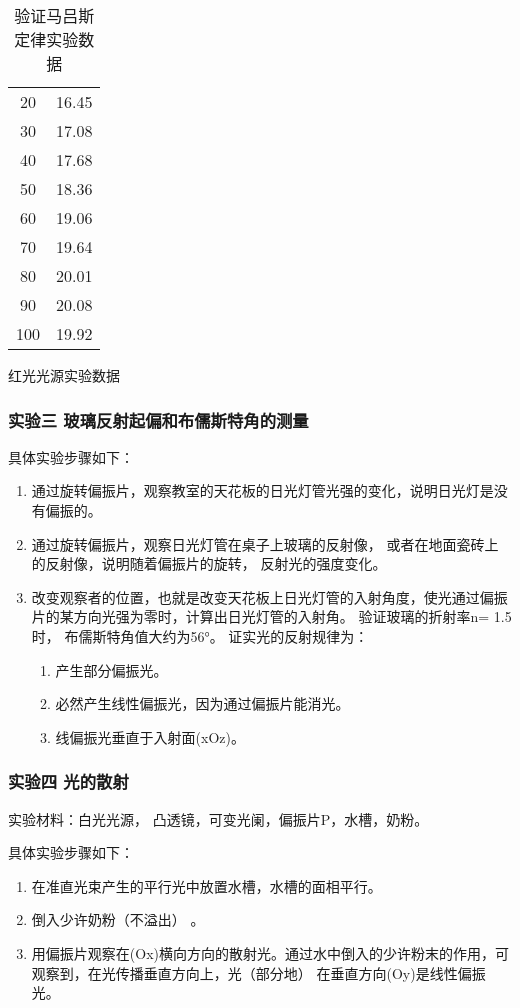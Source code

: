 \documentclass[dvipsnames, svgnames,a4paper,11pt]{article}
\begin{document}
\begin{table}[htbp]
\begin{minipage}[t]{0.3\linewidth}
\begin{tabular}{|cc|}
			20  & 16.45  \\
			30  & 17.08  \\
			40  & 17.68  \\
			50  & 18.36  \\
			60  & 19.06  \\
			70  & 19.64  \\
			80  & 20.01  \\
			90  & 20.08  \\
			100 & 19.92  \\
			\hline
			\end{tabular}
			\caption{红光光源实验数据}
		\end{minipage}
		\caption{验证马吕斯定律实验数据}
		\label{tbl:table2-1}
	\end{table}

	\subsubsection{实验三 \quad 玻璃反射起偏和布儒斯特角的测量}


	具体实验步骤如下：
	\begin{enumerate}
		\item 通过旋转偏振片，观察教室的天花板的日光灯管光强的变化，说明日光灯是没有偏振的。
		\item 通过旋转偏振片，观察日光灯管在桌子上玻璃的反射像， 或者在地面瓷砖上的反射像，说明随着偏振片的旋转， 反射光的强度变化。
		\item 改变观察者的位置，也就是改变天花板上日光灯管的入射角度，使光通过偏振片的某方向光强为零时，计算出日光灯管的入射角。 验证玻璃的折射率n= 1.5时， 布儒斯特角值大约为56°。
		证实光的反射规律为：
		\begin{enumerate}[label=\roman*.]
			\item 产生部分偏振光。
			\item 必然产生线性偏振光，因为通过偏振片能消光。
			\item 线偏振光垂直于入射面(xOz)。
		\end{enumerate}
	\end{enumerate}




	\subsubsection{实验四 \quad 光的散射}

	实验材料：白光光源， 凸透镜，可变光阑，偏振片P，水槽，奶粉。

	具体实验步骤如下：
	\begin{enumerate}
		\item 在准直光束产生的平行光中放置水槽，水槽的面相平行。
		\item 倒入少许奶粉（不溢出） 。
		\item 用偏振片观察在(Ox)横向方向的散射光。通过水中倒入的少许粉末的作用，可观察到，在光传播垂直方向上，光（部分地） 在垂直方向(Oy)是线性偏振光。
	\end{enumerate}
\end{document}
